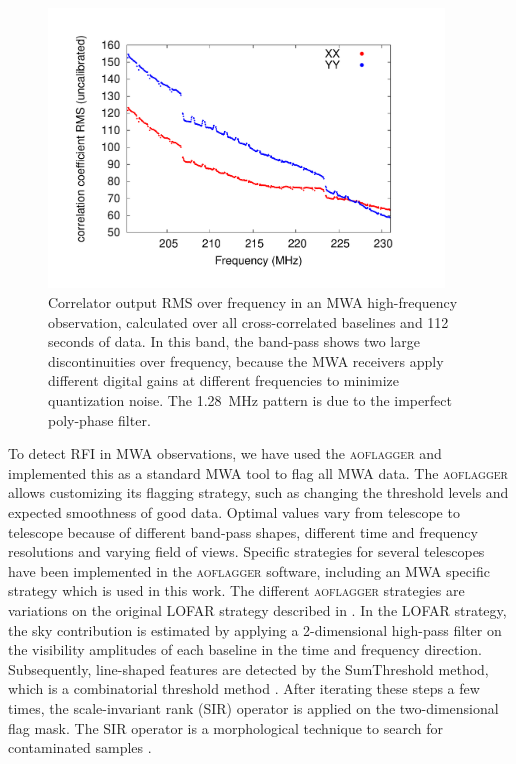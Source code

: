 \documentclass{pasa}
\begin{document}
\begin{figure}
\begin{center}\hspace*{-0.8cm}\includegraphics[width=10.5cm]{img/bandpass}
\caption{Correlator output RMS over frequency in an MWA high-frequency observation, calculated over all cross-correlated baselines and 112 seconds of data. In this band, the band-pass shows two large discontinuities over frequency, because the MWA receivers apply different digital gains at different frequencies to minimize quantization noise. The 1.28~MHz pattern is due to the imperfect poly-phase filter.
}
\label{fig:bandpass}
\end{center}
\end{figure}

To detect RFI in MWA observations, we have used the \textsc{aoflagger} and implemented this as a standard MWA tool to flag all MWA data. The \textsc{aoflagger} allows customizing its flagging strategy, such as changing the threshold levels and expected smoothness of good data. Optimal values vary from telescope to telescope because of different band-pass shapes, different time and frequency resolutions and varying field of views. Specific strategies for several telescopes have been implemented in the \textsc{aoflagger} software, including an MWA specific strategy which is used in this work. The different \textsc{aoflagger} strategies are variations on the original LOFAR strategy described in \citet{lofar-radio-environment}. In the LOFAR strategy, the sky contribution is estimated by applying a 2-dimensional high-pass filter on the visibility amplitudes of each baseline in the time and frequency direction. Subsequently, line-shaped features are detected by the SumThreshold method, which is a combinatorial threshold method \citep{post-correlation-rfi-classification}. After iterating these steps a few times, the scale-invariant rank (SIR) operator is applied on the two-dimensional flag mask. The SIR operator is a morphological technique to search for contaminated samples \citep{scale-invariant-rank-operator}.
\end{document}
